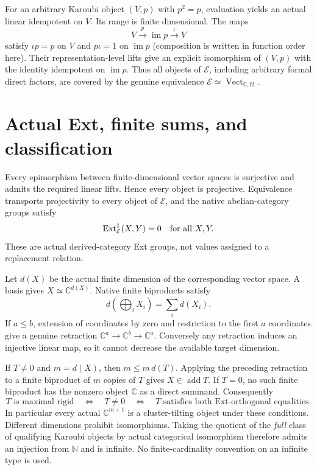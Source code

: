 \documentclass[11pt,a4paper]{article}
\newcommand{\C}{\mathbb C}
\newcommand{\E}{\mathcal E}
\newcommand{\add}{\operatorname{add}}
\newcommand{\Ext}{\operatorname{Ext}}
\begin{document}
For an arbitrary Karoubi object $(V,p)$ with $p^2=p$, evaluation yields an actual
linear idempotent on $V$. Its range is finite dimensional. The maps
\[
 V\xrightarrow{\,p\,}\operatorname{im}p
   \xrightarrow{\,\iota\,}V
\]
satisfy $\iota p=p$ on $V$ and $p\iota=1$ on $\operatorname{im}p$ (composition
is written in function order here). Their representation-level lifts give an
explicit isomorphism of $(V,p)$ with the identity idempotent on
$\operatorname{im}p$. Thus all objects of $\E$, including arbitrary formal
direct factors, are covered by the genuine equivalence
$\E\simeq\operatorname{Vect}_{\C,\mathrm{fd}}$.

\newpage
\section*{Actual Ext, finite sums, and classification}
Every epimorphism between finite-dimensional vector spaces is surjective and
admits the required linear lifts. Hence every object is projective.
Equivalence transports projectivity to every object of $\E$, and the native
abelian-category groups satisfy
\[
                    \Ext^1_{\E}(X,Y)=0\quad\hbox{for all }X,Y.
\]
These are actual derived-category Ext groups, not values assigned to a
replacement relation.

Let $d(X)$ be the actual finite dimension of the corresponding vector space.
A basis gives $X\simeq\C^{d(X)}$. Native finite biproducts satisfy
\[
 d\!\left(\bigoplus_i X_i\right)=\sum_i d(X_i).
\]
If $a\le b$, extension of coordinates by zero and restriction to the first $a$
coordinates give a genuine retraction $\C^a\longrightarrow\C^b\longrightarrow
\C^a$. Conversely any retraction induces an injective linear map, so it cannot
decrease the available target dimension.

If $T\ne0$ and $m=d(X)$, then $m\le m\,d(T)$. Applying the preceding
retraction to a finite biproduct of $m$ copies of $T$ gives $X\in\add T$.
If $T=0$, no such finite biproduct has the nonzero object $\C$ as a direct
summand. Consequently
\[
 T\text{ is maximal rigid}\quad\Longleftrightarrow\quad T\ne0
 \quad\Longleftrightarrow\quad T\text{ satisfies both Ext-orthogonal equalities}.
\]
In particular every actual $\C^{m+1}$ is a cluster-tilting object under these
conditions. Different dimensions prohibit isomorphisms. Taking the quotient of
the \emph{full} class of qualifying Karoubi objects by actual categorical
isomorphism therefore admits an injection from $\mathbb N$ and is infinite.
No finite-cardinality convention on an infinite type is used.
\end{document}
